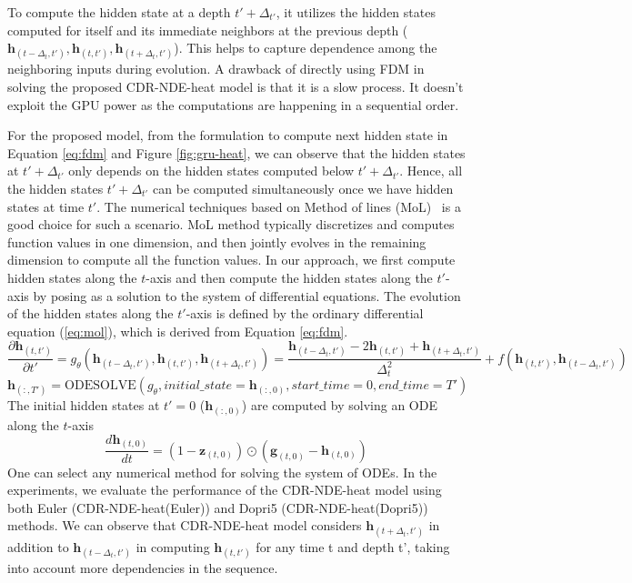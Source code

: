 \documentclass{article} %
\newcommand{\bz}{\mathbf{z}}
\newcommand{\bg}{\mathbf{g}}
\newcommand{\bh}{\mathbf{h}}
\begin{document}
 To compute the hidden state at a depth $t' + \Delta_{t'}$, it utilizes the hidden states computed for itself and its immediate neighbors at the previous depth ($\bh_{(t-\Delta_{t},t')}, \bh_{(t,t')},  \bh_{(t +\Delta_{t},t')}$). This helps to capture dependence among the neighboring inputs during evolution. A drawback of directly using FDM in solving the proposed CDR-NDE-heat model is that it is a slow process. It doesn't exploit the GPU power as the computations are happening in  a sequential order. 
 
 For the proposed model, from  the formulation to compute next hidden state in Equation \ref{eq:fdm} and  Figure \ref{fig:gru-heat}, we can observe that the  hidden states at $t'+\Delta_{t'}$ only depends on the hidden states computed below $t'+\Delta_{t'}$. Hence,  all the hidden states $t'+\Delta_{t'}$ can be computed simultaneously once we have hidden states at time $t'$. The  numerical techniques based on Method of lines (MoL)~\citep{schiesser2012numerical} is a good choice for such a scenario. MoL method typically discretizes and computes function values in one dimension, and  then jointly evolves in the remaining dimension to compute all the function values. In our approach, we first compute hidden states along the $t$-axis and then compute the hidden states along the $t'$-axis by posing  as a solution to the system of differential equations. The evolution of the hidden states along the  $t'$-axis is defined  by the ordinary differential equation (\ref{eq:mol}), which is derived from Equation \ref{eq:fdm}. 
 \begin{equation}
\frac{\partial \bh_{(t,t')}}{\partial t'} = g_\theta(\bh_{(t-\Delta_{t},t')}, \bh_{(t,t')}, \bh_{(t +\Delta_{t},t')}) =  \frac{\bh_{(t-\Delta_{t},t')} -2\bh_{(t,t')} + \bh_{(t +\Delta_{t},t')}} {\Delta_{t}^2} +  f(\bh_{(t,t')},\bh_{(t-\Delta_{t},t')})
 \label{eq:mol}
 \end{equation}
 \begin{equation}
\bh_{(:,T')} = \text{ODESOLVE}(g_\theta,initial\_state = \bh_{(:,0)},start\_time = 0,end\_time=T') \nonumber
\label{eq:solve}
 \end{equation}
 The initial hidden states  at $t'=0$ ($\bh_{(:,0)}$) are computed  by solving an ODE along the  $t$-axis
\begin{equation}
    \frac{d\bh_{(t,0)}}{ dt} = (1-\bz_{(t,0)}) \odot (\bg_{(t,0)} - \bh_{(t,0)})
\end{equation}
 One can select any numerical method for solving the system of ODEs. In the experiments, we evaluate the performance of the CDR-NDE-heat model  using both   Euler (CDR-NDE-heat(Euler)) and  Dopri5 (CDR-NDE-heat(Dopri5)) methods.  We can observe that CDR-NDE-heat model considers  $\bh_{(t + \Delta_{t},t')}$ in addition to $\bh_{(t-\Delta_{t},t')}$ in computing $\bh_{(t,t')} $ for any time t and depth t',  taking into account more dependencies in the sequence.
\end{document}
